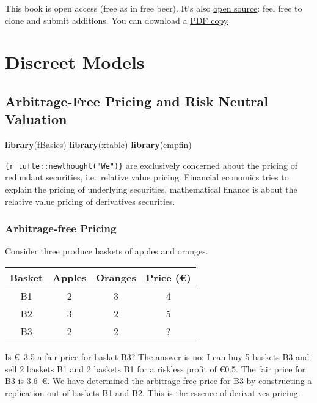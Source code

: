 \documentclass[justified]{tufte-book}
\newenvironment{Shaded}{}{}
\newcommand{\KeywordTok}[1]{\textcolor[rgb]{0.00,0.44,0.13}{\textbf{#1}}}
\newcommand{\NormalTok}[1]{#1}
\begin{document}
This book is open access (free as in free beer). It's also \href{https://github.com/phenaff/empirical-finance-2}{open source}: feel free to clone and submit additions.
You can download a \href{https://github.com/phenaff/empirical-finance-2/docs/empiricalfin.pdf}{PDF copy}

\hypertarget{part-discreet-models}{%
\part*{Discreet Models}\label{part-discreet-models}}

\hypertarget{arb-free-pricing}{%
\chapter{Arbitrage-Free Pricing and Risk Neutral Valuation}\label{arb-free-pricing}}

\begin{Shaded}
\begin{Highlighting}[]
\KeywordTok{library}\NormalTok{(fBasics)}
\KeywordTok{library}\NormalTok{(xtable)}
\KeywordTok{library}\NormalTok{(empfin)}
\end{Highlighting}
\end{Shaded}

\texttt{\{r\ tufte::newthought("We")\}} are exclusively concerned about the pricing of redundant securities,
i.e.~relative value pricing. Financial economics tries to explain the
pricing of underlying securities, mathematical finance is about the
relative value pricing of derivatives securities.

\hypertarget{arbitrage-free-pricing}{%
\section{Arbitrage-free Pricing}\label{arbitrage-free-pricing}}

Consider three produce baskets of apples and oranges.

\begin{longtable}[]{@{}cccc@{}}
\toprule
Basket & Apples & Oranges & Price (€)\tabularnewline
\midrule
\endhead
B1 & 2 & 3 & 4\tabularnewline
B2 & 3 & 2 & 5\tabularnewline
B3 & 2 & 2 & ?\tabularnewline
\bottomrule
\end{longtable}

Is €~3.5 a fair price for basket B3? The answer is no: I can buy 5
baskets B3 and sell 2 baskets B1 and 2 baskets B1 for a riskless profit
of €0.5. The fair price for B3 is 3.6~€. We have determined the
arbitrage-free price for B3 by constructing a replication out of baskets
B1 and B2. This is the essence of derivatives pricing.
\end{document}

